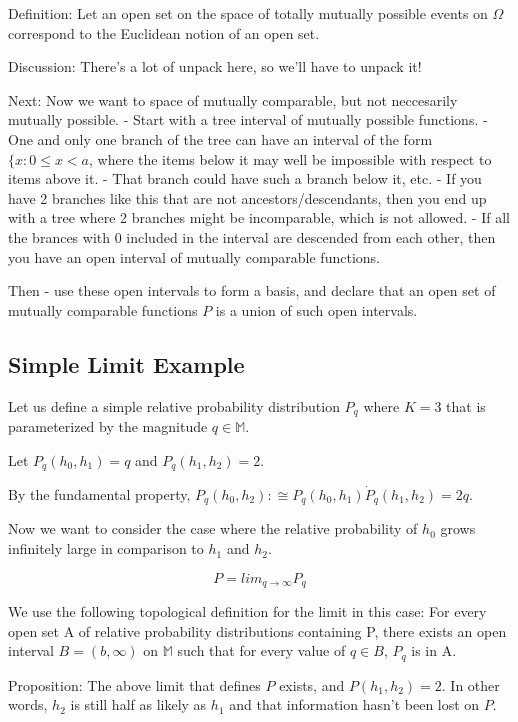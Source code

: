 \documentclass[twoside]{article}
\begin{document}
Definition: Let an open set on the space of totally mutually possible events on \(\Omega\) correspond to the Euclidean notion of an open set.

Discussion: There's a lot of unpack here, so we'll have to unpack it!

Next: Now we want to space of mutually comparable, but not neccesarily mutually possible.
- Start with a tree interval of mutually possible functions.
- One and only one branch of the tree can have an interval of the form \(\{x: 0 \leq x < a\), where the items below it may well be impossible with respect to items above it.
- That branch could have such a branch below it, etc.
- If you have 2 branches like this that are not ancestors/descendants, then you end up with a tree where 2 branches might be incomparable, which is not allowed.
- If all the brances with 0 included in the interval are descended from each other, then you have an open interval of mutually comparable functions.

Then - use these open intervals to form a basis, and declare that an open set of mutually comparable functions \(P\) is a union of such open intervals.

\subsection{Simple Limit Example}

Let us define a simple relative probability distribution \(P_q\) where \(K = 3\) that is parameterized by the magnitude \(q \in \mathbb{M}\).

Let \(P_q(h_0, h_1) = q\) and \(P_q(h_1, h_2) = 2\).

By the fundamental property, \(P_q(h_0, h_2) :\cong P_q(h_0, h_1) \dot P_q(h_1, h_2) = 2q\).

Now we want to consider the case where the relative probability of \(h_0\) grows infinitely large in comparison to \(h_1\) and \(h_2\).

\[P = lim_{q \rightarrow \infty} P_q\]

We use the following topological definition for the limit in this case: For every open set A of relative probability distributions containing P, there exists an open interval \(B=(b, \infty)\) on \(\mathbb{M}\) such that for every value of \(q \in B\), \(P_q\) is in A.

Proposition: The above limit that defines \(P\) exists, and \(P(h_1, h_2) = 2\). In other words, \(h_2\) is still half as likely as \(h_1\) and that information hasn't been lost on \(P\).
\end{document}
